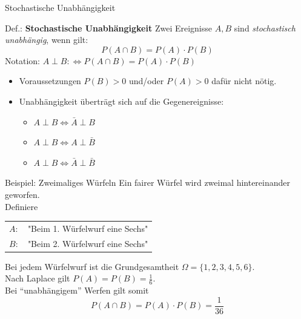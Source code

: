 \documentclass[
  10pt,
  ignorenonframetext,
]{beamer}
\providecommand{\tightlist}{%
  \setlength{\itemsep}{0pt}\setlength{\parskip}{0pt}}
\begin{document}
\begin{frame}{Stochastische Unabhängigkeit}
\protect\hypertarget{stochastische-unabhuxe4ngigkeit-1}{}
\begin{block}{Def.: \textbf{Stochastische Unabhängigkeit}}
\protect\hypertarget{def.-stochastische-unabhuxe4ngigkeit}{}
Zwei Ereignisse \(A, B\) sind \emph{stochastisch unabhängig}, wenn gilt:
\[ P(A \cap B) = P(A) \cdot P(B)\] Notation:
\(A \perp B :\iff P(A \cap B) = P(A) \cdot P(B)\)
\end{block}

\begin{itemize}
\tightlist
\item
  Voraussetzungen \(P(B) > 0\) und/oder \(P(A) > 0\) dafür nicht nötig.
\item
  Unabhängigkeit überträgt sich auf die Gegenereignisse:

  \begin{itemize}
  \tightlist
  \item
    \(A \perp B \iff \bar{A} \perp B\)
  \item
    \(A \perp B \iff A \perp \bar B\)
  \item
    \(A \perp B \iff \bar A \perp \bar B\)
  \end{itemize}
\end{itemize}

\end{frame}

\begin{frame}{Beispiel: Zweimaliges Würfeln}
\protect\hypertarget{beispiel-zweimaliges-wuxfcrfeln}{}
Ein fairer Würfel wird zweimal hintereinander geworfen.\\
Definiere

\begin{tabular}{ll}
$A:$ & "Beim 1. Würfelwurf eine Sechs" \\
$B:$ & "Beim 2. Würfelwurf eine Sechs"
\end{tabular}

Bei jedem Würfelwurf ist die Grundgesamtheit
\(\Omega = \{1,2,3,4,5,6 \}\).\\
Nach Laplace gilt \(P(A) = P(B) = \frac{1}{6}\).\\
Bei ``unabhängigem'' Werfen gilt somit \[
P(A \cap B) = P(A) \cdot P(B) = \frac{1}{36}
\]
\end{frame}
\end{document}
